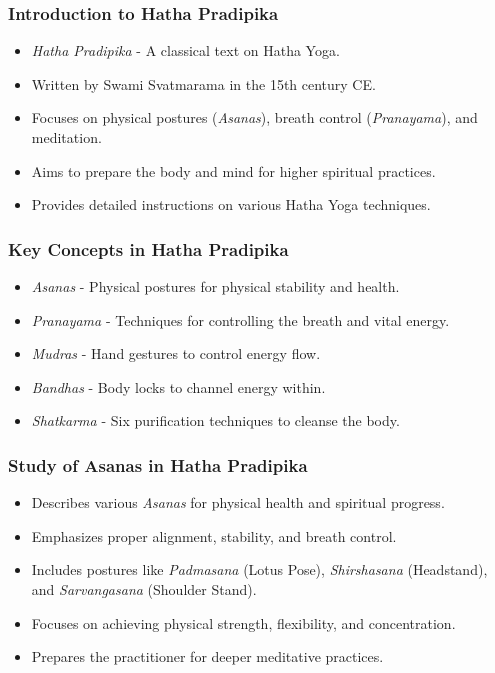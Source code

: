 \begin{frame}[fragile]\frametitle{Introduction to Hatha Pradipika}

      \begin{itemize}
		\item \textit{Hatha Pradipika} - A classical text on Hatha Yoga.
		\item Written by Swami Svatmarama in the 15th century CE.
		\item Focuses on physical postures (\textit{Asanas}), breath control (\textit{Pranayama}), and meditation.
		\item Aims to prepare the body and mind for higher spiritual practices.
		\item Provides detailed instructions on various Hatha Yoga techniques.
	  \end{itemize}

\end{frame}

\begin{frame}[fragile]\frametitle{Key Concepts in Hatha Pradipika}

      \begin{itemize}
		\item \textit{Asanas} - Physical postures for physical stability and health.
		\item \textit{Pranayama} - Techniques for controlling the breath and vital energy.
		\item \textit{Mudras} - Hand gestures to control energy flow.
		\item \textit{Bandhas} - Body locks to channel energy within.
		\item \textit{Shatkarma} - Six purification techniques to cleanse the body.
	  \end{itemize}

\end{frame}

\begin{frame}[fragile]\frametitle{Study of Asanas in Hatha Pradipika}

      \begin{itemize}
		\item Describes various \textit{Asanas} for physical health and spiritual progress.
		\item Emphasizes proper alignment, stability, and breath control.
		\item Includes postures like \textit{Padmasana} (Lotus Pose), \textit{Shirshasana} (Headstand), and \textit{Sarvangasana} (Shoulder Stand).
		\item Focuses on achieving physical strength, flexibility, and concentration.
		\item Prepares the practitioner for deeper meditative practices.
	  \end{itemize}

\end{frame}

